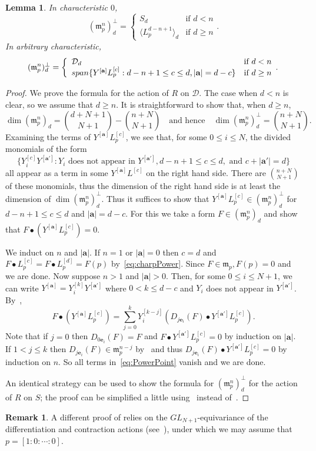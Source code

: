 \documentclass[12pt, reqno]{amsart}
\numberwithin{equation}{section}
\newcommand{\ba}{\mathbf{a}}
\newcommand{\be}{\mathbf{e}}
\newcommand{\fm}{{\mathfrak m}}
\newcommand{\contract}{\bullet}
\theoremstyle{plain} %
\newtheorem{lem}[thm]{Lemma}
\theoremstyle{definition}
\newtheorem{rem}[thm]{Remark}
\theoremstyle{remark}
\begin{document}
\begin{lem}
\label{lem:OnePointInverseSystem}
In characteristic $0$,
\[
(\fm_p^n)^\perp_d=
\left\lbrace
\begin{array}{ll}
S_d & \mbox{if } d<n\\
\langle L_p^{d-n+1} \rangle_{d} & \mbox{if } d\ge n
\end{array}.
\right.
\]
In arbitrary characteristic,
\[
(\fm_p^n)^\perp_d=
\left\lbrace
\begin{array}{ll}
\mathcal{D}_d & \mbox{if } d<n\\
{\rm span}\{ Y^{[\ba]}L_p^{[c]}: d-n+1\le c \le d, |\ba|=d-c \} & \mbox{if } d\ge n
\end{array}.
\right.
\]
\end{lem}
\begin{proof}
We prove the formula for the action of $R$ on $\mathcal{D}$.  The case when $d<n$ is clear, so we assume that $d\ge n$.  It is straightforward to show that, when $d\ge n$,
\[
\dim (\fm_p^n)_d=\binom{d+N+1}{N+1}-\binom{n+N}{N+1} \quad \mbox{and hence} \quad
\dim (\fm_p^n)^\perp_d=\binom{n+N}{N+1}.
\]
Examining the terms of $Y^{[\ba]}L_p^{[c]}$, we see that, for some $0\le i\le N$, the divided monomials of the form
\[
\{Y_i^{[c]}Y^{[\ba']}: Y_i \mbox{ does not appear in } Y^{[\ba']}, d-n+1\le c\le d, \mbox{ and } c+|\ba'|=d\}
\]
all appear as a term in some $Y^{[\ba]}L^{[c]}$ on the right hand side.  There are $\binom{n+N}{N+1}$ of these monomials, thus the dimension of the right hand side is at least the dimension of $\dim (\fm_p^n)^\perp_d$.  Thus it suffices to show that $Y^{[\ba]}L_p^{[c]}\in (\fm_p^n)_d^\perp$ for $d-n+1\le c\le d$ and $|\ba|=d-c$.  For this we take a form $F\in (\fm_p^n)_d$ and show that $F\contract (Y^{[\ba]}L_p^{[c]})=0$.

We induct on $n$ and $|\ba|$.  If $n=1$ or $|\ba|=0$ then $c=d$ and $F\contract L_p^{[c]}=F\contract L_p^{[d]}=F(p)$ by~\eqref{eq:charpPower}.  Since $F\in \fm_p, F(p)=0$ and we are done.  Now suppose $n>1$ and $|\ba|>0$.  Then, for some $0\le i\le N+1$, we can write $Y^{[\ba]}=Y_i^{[k]}Y^{[\ba']}$ where $0<k\le d-c$ and $Y_i$ does not appear in $Y^{[\ba']}$.  By~,
\begin{equation}
\label{eq:PowerPoint}
F\contract(Y^{[\ba]}L_p^{[c]})=\sum_{j=0}^k Y_i^{[k-j]}(D_{j\be_i}(F)\contract Y^{[\ba']}L_p^{[c]} ).
\end{equation}
Note that if $j=0$ then $D_{0\be_i}(F)=F$ and $F\contract Y^{[\ba']}L_p^{[c]}=0$ by induction on $|\ba|$.  If $1<j\le k$ then $D_{j\be_i}(F)\in \fm_p^{n-j}$ by~ and thus $D_{j\be_i}(F)\contract Y^{[\ba']}L_p^{[c]}=0$ by induction on $n$.  So all terms in~\eqref{eq:PowerPoint} vanish and we are done.

An identical strategy can be used to show the formula for $(\fm_p^n)^\perp_d$ for the action of $R$ on $S$; the proof can be simplified a little using~ instead of~.
\end{proof}

\begin{rem}
A different proof of  relies on the $GL_{N+1}$-equivariance of the differentiation and contraction actions (see~\cite[Proposition~A.3]{Iarrobino-Kanev-1999}), under which we may assume that $p=[1:0:\cdots:0]$.
\end{rem}
\end{document}
